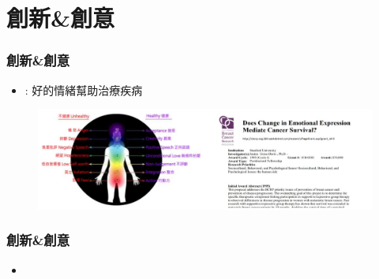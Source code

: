 \documentclass[10pt, conference, compsocconf]{beamer}
\begin{document}
\begin{CJK}{UTF8}{}
\begin{frame}
\end{frame}

\section{創新\&創意}

\begin{frame}
\frametitle{創新\&創意}

\begin{itemize}
\item {} : 好的情緒幫助治療疾病
\end{itemize}
\vspace{5mm}
\begin{figure}[!t]
\begin{center}
\includegraphics[width=12.5cm]{./Figures/fig_theory.pdf}
\end{center}

\end{figure}
\end{frame}

\begin{frame}
\frametitle{創新\&創意}

\begin{itemize}
\item{}
\end{itemize}


\end{frame}
\end{CJK}
\end{document}
